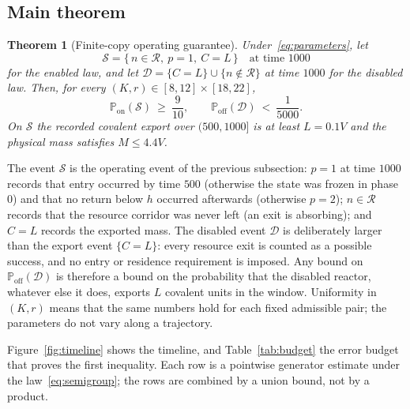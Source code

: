 \documentclass[11pt,a4paper]{article}
\theoremstyle{plain}
\newtheorem{theorem}{Theorem}[section]
\theoremstyle{definition}
\theoremstyle{remark}
\newcommand{\Prob}{\mathbb P}
\newcommand{\R}{\mathcal R}
\newcommand{\Son}{\mathcal S}
\newcommand{\Doff}{\mathcal D}
\begin{document}
\subsection{Main theorem}

\begin{theorem}[Finite-copy operating guarantee]\label{thm:main}
Under~\eqref{eq:parameters}, let
\[
\Son=\{\,n\in\R,\ p=1,\ C=L\,\}\quad\text{at time }1000
\]
for the enabled law, and let $\Doff=\{C=L\}\cup\{n\notin\R\}$ at time $1000$ for the disabled law. Then, for every $(K,r)\in[8,12]\times[18,22]$,
\begin{equation}\label{eq:main}
\Prob_{\mathrm{on}}(\Son)\ \ge\ \frac9{10},\qquad
\Prob_{\mathrm{off}}(\Doff)\ <\ \frac1{5000}.
\end{equation}
On $\Son$ the recorded covalent export over $(500,1000]$ is at least $L=0.1V$ and the physical mass satisfies $M\le4.4V$.
\end{theorem}

The event $\Son$ is the operating event of the previous subsection: $p=1$ at time $1000$ records that entry occurred by time $500$ (otherwise the state was frozen in phase $0$) and that no return below $h$ occurred afterwards (otherwise $p=2$); $n\in\R$ records that the resource corridor was never left (an exit is absorbing); and $C=L$ records the exported mass. The disabled event $\Doff$ is deliberately larger than the export event $\{C=L\}$: every resource exit is counted as a possible success, and no entry or residence requirement is imposed. Any bound on $\Prob_{\mathrm{off}}(\Doff)$ is therefore a bound on the probability that the disabled reactor, whatever else it does, exports $L$ covalent units in the window. Uniformity in $(K,r)$ means that the same numbers hold for each fixed admissible pair; the parameters do not vary along a trajectory.

Figure~\ref{fig:timeline} shows the timeline, and Table~\ref{tab:budget} the error budget that proves the first inequality. Each row is a pointwise generator estimate under the law~\eqref{eq:semigroup}; the rows are combined by a union bound, not by a product.
\end{document}

